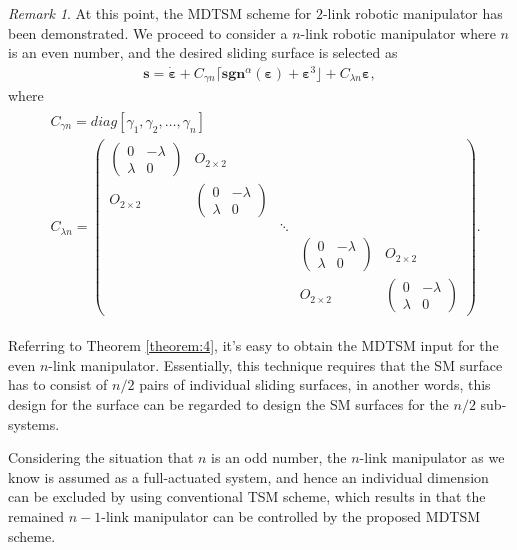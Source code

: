 \documentclass[3p]{elsarticle}
\theoremstyle{plain}
\theoremstyle{remark}
\newtheorem{myrem}{Remark}
\begin{document}
\begin{myrem}
At this point, the MDTSM scheme for $2$-link robotic manipulator has been demonstrated. We proceed to consider a $n$-link robotic manipulator where $n$ is an even number, and the desired sliding surface is selected as
\begin{align}
\bm s = \dot{\bm \varepsilon}+C_{\gamma n}\lceil\bm{sgn}^\alpha(\bm \varepsilon)+\bm\varepsilon^3\rfloor+C_{\lambda n}{\bm\varepsilon},
\end{align}
where
\begin{align}
\begin{split}
&C_{\gamma n}=diag[\gamma_1,\gamma_2,\ldots,\gamma_n]\\
&C_{\lambda n}=
\begin{pmatrix}
\begin{pmatrix}
0 &-\lambda\\ \lambda &0
\end{pmatrix} &O_{2\times 2} & & &\\
O_{2\times 2} &\begin{pmatrix}
0 &-\lambda\\ \lambda &0
\end{pmatrix} & & &\\
& &\ddots & &\\
& & &\begin{pmatrix}
0 &-\lambda\\ \lambda &0
\end{pmatrix} &O_{2\times 2}\\
& & &O_{2\times 2} &\begin{pmatrix}
0 &-\lambda\\ \lambda &0
\end{pmatrix}
\end{pmatrix}.
\end{split}
\end{align}\par
Referring to Theorem \ref{theorem:4}, it's easy to obtain the MDTSM input for the even $n$-link manipulator. Essentially, this technique requires that the SM surface has to consist of $n/2$ pairs of individual sliding surfaces, in another words, this design for the surface can be regarded to design the SM surfaces for the $n/2$ sub-systems.\par
Considering the situation that $n$ is an odd number, the $n$-link manipulator as we know is assumed as a full-actuated system, and hence an individual dimension can be excluded by using conventional TSM scheme, which results in that the remained $n-1$-link manipulator can be controlled by the proposed MDTSM scheme.
\end{myrem}
\end{document}
